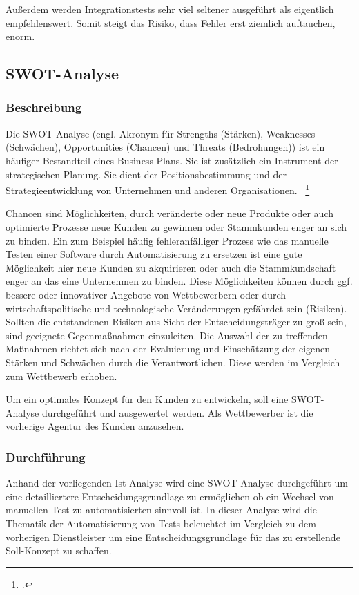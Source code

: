 Außerdem werden Integrationstests sehr viel seltener ausgeführt als eigentlich empfehlenswert. Somit steigt das Risiko, dass Fehler erst ziemlich auftauchen, enorm.  

\subsection{SWOT-Analyse}
\subsubsection{Beschreibung}
Die SWOT-Analyse (engl. Akronym für Strengths (Stärken), Weaknesses (Schwächen), Opportunities (Chancen) und Threats (Bedrohungen)) ist ein häufiger Bestandteil eines Business Plans. Sie ist zusätzlich ein Instrument der strategischen Planung. Sie dient der Positionsbestimmung und der Strategieentwicklung von Unternehmen und anderen Organisationen. ~\footcite[Vgl. Seite 240]{Meffert.2012}

Chancen sind Möglichkeiten, durch veränderte oder neue Produkte oder auch optimierte Prozesse neue Kunden zu gewinnen oder Stammkunden enger an sich zu binden. Ein zum Beispiel häufig fehleranfälliger Prozess wie das manuelle Testen einer Software durch Automatisierung zu ersetzen ist eine gute Möglichkeit hier neue Kunden zu akquirieren oder auch die Stammkundschaft enger an das eine Unternehmen zu binden. Diese Möglichkeiten können durch ggf. bessere oder innovativer Angebote von Wettbewerbern oder durch wirtschaftspolitische und technologische Veränderungen gefährdet sein (Risiken). Sollten die entstandenen Risiken aus Sicht der Entscheidungsträger zu groß sein, sind geeignete Gegenmaßnahmen einzuleiten. Die Auswahl der zu treffenden Maßnahmen richtet sich nach der Evaluierung und Einschätzung der eigenen Stärken und Schwächen durch die Verantwortlichen. Diese werden im Vergleich zum Wettbewerb erhoben.

Um ein optimales Konzept für den Kunden zu entwickeln, soll eine SWOT-Analyse durchgeführt und ausgewertet werden. Als Wettbewerber ist die vorherige Agentur des Kunden anzusehen.

\subsubsection{Durchführung}
Anhand der vorliegenden Ist-Analyse wird eine SWOT-Analyse durchgeführt um eine detailliertere Entscheidungsgrundlage zu ermöglichen ob ein Wechsel von manuellen Test zu automatisierten sinnvoll ist. In dieser Analyse wird die Thematik der Automatisierung von Tests beleuchtet im Vergleich zu dem vorherigen Dienstleister um eine Entscheidungsgrundlage für das zu erstellende Soll-Konzept zu schaffen.

